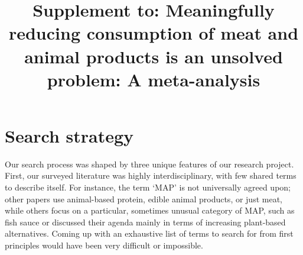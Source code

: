 \documentclass[sn-nature,referee,pdflatex]{sn-jnl}
\begin{document}
\title[MAP-reduction-supplement]{Supplement to: Meaningfully reducing
consumption of meat and animal products is an unsolved problem: A
meta-analysis}


\author*[1]{  }

\author[1]{  }

\author[2]{  }




\abstract{}




\maketitle

\section{Search strategy}\label{search-strategy}

Our search process was shaped by three unique features of our research
project. First, our surveyed literature was highly interdisciplinary,
with few shared terms to describe itself. For instance, the term `MAP'
is not universally agreed upon; other papers use animal-based protein,
edible animal products, or just meat, while others focus on a
particular, sometimes unusual category of MAP, such as fish sauce
\citep{kanchanachitra2020} or discussed their agenda mainly in terms of
increasing plant-based alternatives. Coming up with an exhaustive list
of terms to search for from first principles would have been very
difficult or impossible.
\end{document}
